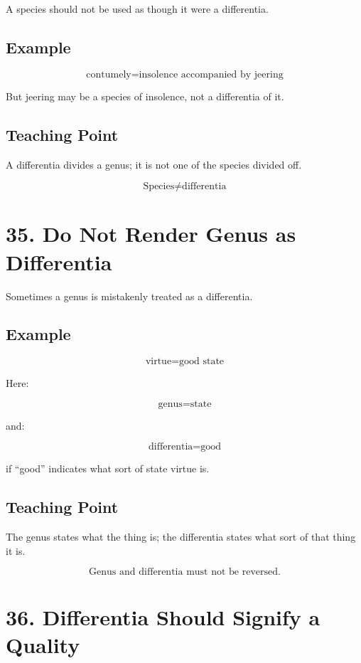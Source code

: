 \documentclass[12pt]{article}
\begin{document}
A species should not be used as though it were a differentia.

\subsection*{Example}

\[
\text{contumely} = \text{insolence accompanied by jeering}
\]

But jeering may be a species of insolence, not a differentia of it.

\subsection*{Teaching Point}

A differentia divides a genus; it is not one of the species divided off.

\[
\boxed{
\text{Species} \neq \text{differentia}
}
\]

\section*{35. Do Not Render Genus as Differentia}

Sometimes a genus is mistakenly treated as a differentia.

\subsection*{Example}

\[
\text{virtue} = \text{good state}
\]

Here:

\[
\text{genus} = \text{state}
\]

and:

\[
\text{differentia} = \text{good}
\]

if ``good'' indicates what sort of state virtue is.

\subsection*{Teaching Point}

The genus states what the thing is; the differentia states what sort of that
thing it is.

\[
\boxed{
\text{Genus and differentia must not be reversed.}
}
\]

\section*{36. Differentia Should Signify a Quality}
\end{document}

